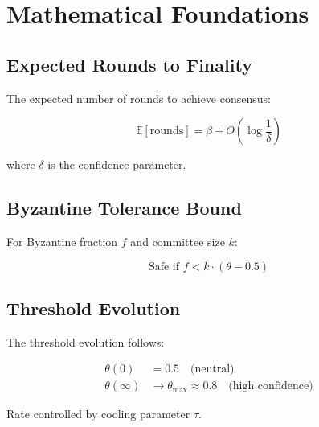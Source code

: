 \section{Mathematical Foundations}

\label{sec:math}

\subsection{Expected Rounds to Finality}

The expected number of rounds to achieve consensus:

\begin{equation}
\mathbb{E}[\text{rounds}] = \beta + O\left(\log\frac{1}{\delta}\right)
\end{equation}

where $\delta$ is the confidence parameter.

\subsection{Byzantine Tolerance Bound}

For Byzantine fraction $f$ and committee size $k$:

\begin{equation}
\text{Safe if } f < k \cdot (\theta - 0.5)
\end{equation}

\subsection{Threshold Evolution}

The threshold evolution follows:

\begin{align}
\theta(0) &= 0.5 \quad \text{(neutral)} \\
\theta(\infty) &\to \theta_{\max} \approx 0.8 \quad \text{(high confidence)}
\end{align}

Rate controlled by cooling parameter $\tau$.

